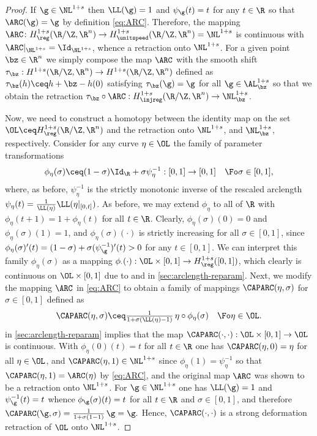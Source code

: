 \begin{proof}
If $\g\in\NL^{1+s}$ then $\LL(\g)=1$ and $\psi_\g(t)=t$ for any $t\in\R$ so
that $\ARC(\g)=\g$ by definition \cref{eq:ARC}. 
Therefore, the mapping $\ARC \colon H^{1+s}_\reg(\R/\Z,\R^n)\to
H^{1+s}_\unitspeed(\R/\Z,\R^n)=\NL^{1+s}$ 
is continuous with $\ARC|_{\NL^{1+s}}=
\Id_{\NL^{1+s}}$, whence a retraction onto $\NL^{1+s}$.
For a given point $\bz\in\R^n$ we simply compose
the map $\ARC$ with the smooth
shift $\tau_\bz:H^{1+s}(\R/\Z,\R^n)\to
H^{1+s}(\R/\Z,\R^n)$ defined as $\tau_\bz(h) \ceq h+\bz-h(0)$
satisfying $\tau_\bz(\g)=\g$ for all $\g\in\AL^{1+s}_\bz$ 
so that we
obtain the retraction $\tau_\bz\circ\ARC:H^{1+s}_\injreg(\R/\Z,\R^n)
\to\NL^{1+s}_\bz$.

Now, we need to construct a homotopy between the identity map on the set
$\OL \ceq H^{1+s}_\reg(\R/\Z,\R^n)$ and the retraction onto $\NL^{1+s}$, and $\NL^{1+s}_\bz$, respectively.
Consider for any curve $\eta\in \OL$
the family of parameter transformations 
\begin{equation}\label{eq:familiy-param}
\phi_\eta(\sigma) \ceq (1-\sigma)\Id_\R+
\sigma\psi_\eta^{-1}:[0,1]\to [0,1]\quad\Fo \sigma\in [0,1],
\end{equation}
where, as before, $\psi_\eta^{-1}$ is the strictly monotonic inverse
of the rescaled arclength $\psi_\eta(t)=\frac1{\LL(\eta)}\LL(\eta|_{[0,t]})$.
As before, we may extend $\phi_\eta$ to all of $\R$ with
$\phi_\eta(t+1)=1+\phi_\eta(t)$ for all $t\in\R$.
Clearly, 
$\phi_\eta(\sigma)(0)=0$ and $\phi_\eta(\sigma)(1)=1$, and $\phi_\eta(\sigma)
(\cdot)$
is strictly
increasing for all $\sigma\in [0,1]$, since
$\phi_{\eta}(\sigma)'(t)=(1-\sigma)+\sigma (\psi_\g^{-1})'(t)>0$ for
any $t\in [0,1]$. We can interpret this family $\phi_\eta(\sigma)$ as 
a mapping $\phi_{\cdot}(\cdot):\OL\times [0,1]\to
H^{1+s}_\reg([0,1])$, which clearly is continuous on
$\OL\times [0,1]$ 
due to  and 
 in \cref{sec:arclength-reparam}.
Next, we modify the mapping $\ARC$ in \cref{eq:ARC} to obtain
a family of mappings $\CAPARC(\eta,\sigma)$ for $\sigma\in [0,1]$ defined as
\begin{equation}\label{eq:ARC-sigma}
\textstyle
\CAPARC(\eta,\sigma)\ceq\frac1{1+\sigma(\LL(\eta)-1)}\,\eta\circ\phi_\eta(\sigma)
\quad\Fo\eta\in \OL.
\end{equation}
 in \cref{sec:arclength-reparam}
implies that the map 
$\CAPARC(\cdot,\cdot):\OL\times [0,1]\to \OL
$ is continuous. With $\phi_\eta(0)(t)=t$ for all $t\in\R$ one has $\CAPARC(\eta,0)=\eta$
for all $\eta\in \OL$, and $\CAPARC(\eta,1)\in\NL^{1+s}$ since $\phi_\eta(1)=
\psi_\eta^{-1}$ so that $\CAPARC(\eta,1)=\ARC(\eta)$ by \cref{eq:ARC}, 
and the original map
$\ARC$ was shown 
to be a retraction onto $\NL^{1+s}$.
For $\g\in\NL^{1+s}$ one has $\LL(\g)=1$ and $\psi_\g^{-1}(t)=t$ whence 
$\phi_\g(\sigma)(t)=t$ for all $t\in\R$ and $\sigma\in [0,1]$, 
and therefore 
$
\CAPARC(\g,\sigma)=\frac1{1+\sigma(1 -1)}\,\g=\g.$
Hence, $\CAPARC(\cdot,\cdot)$ is a strong deformation 
retraction of $\OL$ onto $\NL^{1+s}$.


\end{proof}
